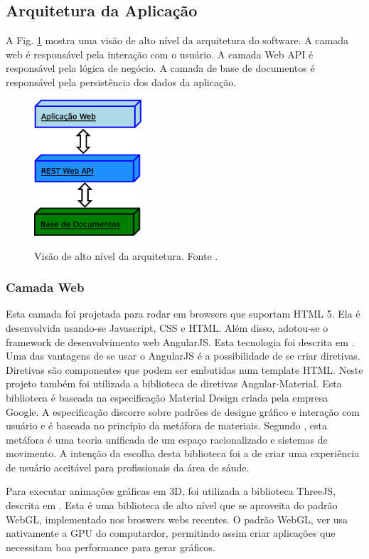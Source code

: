 \documentclass[journal]{IEEEtran}
\begin{document}
\subsection{Arquitetura da Aplicação}
A Fig. \ref{camadas} mostra uma visão de alto nível da
arquitetura do software. A camada web é responsável pela interação com o usuário. 
A camada Web API  é responsável pela lógica de negócio. 
A camada de base de documentos é responsável pela
persistência dos dados da aplicação.
\begin{figure}[!t]
	\centering
	{\includegraphics[width=4cm]{camadas}}
	\caption{Visão de alto nível da arquitetura. Fonte \cite{Lima2015}.}
	\label{camadas}
\end{figure}

\subsubsection{Camada Web}
Esta camada foi projetada para rodar em browsers que suportam HTML 5. Ela é 
desenvolvida usando-se Javascript, CSS e HTML. Além disso, adotou-se o framework de
desenvolvimento web AngularJS. Esta tecnologia foi descrita em \cite{Branas2014}.
Uma das vantagens de se usar o AngularJS é a possibilidade de se criar diretivas.
Diretivas são componentes que podem ser embutidas num template HTML.
Neste projeto também foi utilizada a biblioteca de diretivas Angular-Material.
Esta biblioteca é baseada na especificação Material Design criada pela empresa Google. 
A especificação discorre sobre padrões de designe gráfico e interação com usuário e é baseada 
no princípio da metáfora de materiais. 
Segundo \cite{Google2015a}, esta metáfora é uma teoria unificada de um espaço racionalizado
e sistemas de movimento. A intenção da escolha desta biblioteca foi a de criar
uma experiência de usuário aceitável para profissionais da área de sáude.

Para executar animações gráficas em 3D, foi utilizada a biblioteca ThreeJS, descrita em \cite{Dirksen2015}.
Esta é uma biblioteca de alto nível que se aproveita do padrão WebGL, implementado
nos broswers webs recentes. O padrão WebGL, ver \cite{Matsuda2013} usa nativamente a GPU do computardor, 
permitindo assim criar aplicações que necessitam boa performance para gerar
gráficos. 
\end{document}
